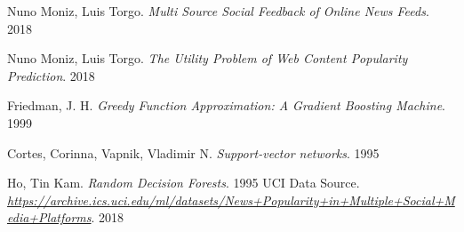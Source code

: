 \documentclass{article}
\begin{document}
\medskip

\begin{thebibliography}{}
 Nuno Moniz, Luis Torgo.
\textit{Multi Source Social Feedback of Online News Feeds}. 
 2018
 
 Nuno Moniz, Luis Torgo.
\textit{The Utility Problem of Web Content Popularity Prediction}.
 2018

Friedman, J. H. 
\textit{Greedy Function Approximation: A Gradient Boosting Machine}.
 1999

Cortes, Corinna, Vapnik, Vladimir N.
\textit{Support-vector networks}.
 1995

Ho, Tin Kam.
\textit{Random Decision Forests}.
 1995
UCI Data Source.
 \textit{\url{https://archive.ics.uci.edu/ml/datasets/News+Popularity+in+Multiple+Social+Media+Platforms}}.
2018
 
\end{thebibliography}
\end{document}
